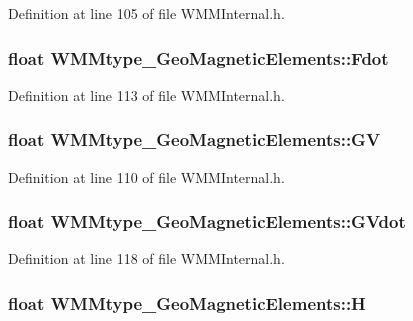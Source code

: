 \-Definition at line 105 of file \-W\-M\-M\-Internal.\-h.

\hypertarget{struct_w_m_mtype___geo_magnetic_elements_aaff92c0324d3a717abc215245cbd5238}{
\subsubsection[{\-Fdot}]{\setlength{\rightskip}{0pt plus 5cm}float {\bf \-W\-M\-Mtype\-\_\-\-Geo\-Magnetic\-Elements\-::\-Fdot}}}\label{struct_w_m_mtype___geo_magnetic_elements_aaff92c0324d3a717abc215245cbd5238}


\-Definition at line 113 of file \-W\-M\-M\-Internal.\-h.

\hypertarget{struct_w_m_mtype___geo_magnetic_elements_aa1d50824f5887167ee93d075222f9deb}{
\subsubsection[{\-G\-V}]{\setlength{\rightskip}{0pt plus 5cm}float {\bf \-W\-M\-Mtype\-\_\-\-Geo\-Magnetic\-Elements\-::\-G\-V}}}\label{struct_w_m_mtype___geo_magnetic_elements_aa1d50824f5887167ee93d075222f9deb}


\-Definition at line 110 of file \-W\-M\-M\-Internal.\-h.

\hypertarget{struct_w_m_mtype___geo_magnetic_elements_ab653a08b7f24f25dd253ff9f16f3b01e}{
\subsubsection[{\-G\-Vdot}]{\setlength{\rightskip}{0pt plus 5cm}float {\bf \-W\-M\-Mtype\-\_\-\-Geo\-Magnetic\-Elements\-::\-G\-Vdot}}}\label{struct_w_m_mtype___geo_magnetic_elements_ab653a08b7f24f25dd253ff9f16f3b01e}


\-Definition at line 118 of file \-W\-M\-M\-Internal.\-h.

\hypertarget{struct_w_m_mtype___geo_magnetic_elements_ae3c575b310c43b133f83cf6bd3b14cfe}{
\subsubsection[{\-H}]{\setlength{\rightskip}{0pt plus 5cm}float {\bf \-W\-M\-Mtype\-\_\-\-Geo\-Magnetic\-Elements\-::\-H}}}\label{struct_w_m_mtype___geo_magnetic_elements_ae3c575b310c43b133f83cf6bd3b14cfe}


